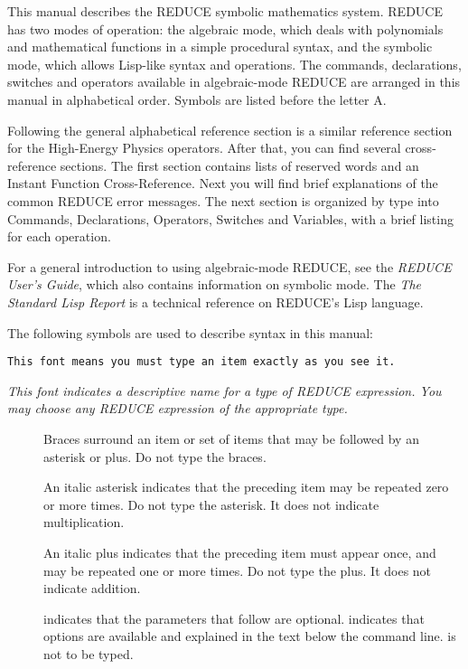 This manual describes the REDUCE symbolic mathematics system.  REDUCE has
two modes of operation: the algebraic mode, which deals with polynomials
and mathematical functions in a simple procedural syntax, and the symbolic
mode, which allows Lisp-like syntax and operations.  The commands,
declarations, switches and operators available in algebraic-mode REDUCE
are arranged in this manual in alphabetical order.  Symbols are listed
before the letter A.

Following the general alphabetical reference section is a similar
reference section for the High-Energy Physics operators.  After that, you
can find several cross-reference sections.  The first section contains
lists of reserved words and an Instant Function Cross-Reference.  Next you
will find brief explanations of the common REDUCE error messages.  The
next section is organized by type into Commands, Declarations, Operators,
Switches and Variables, with a brief listing for each operation.

For a general introduction to using algebraic-mode REDUCE, see the {\em
REDUCE User's Guide}, which also contains information on symbolic mode.
The {\em The Standard Lisp Report} is a technical reference on REDUCE's
Lisp language.

The following symbols are used to describe syntax in this manual:

\begin{verbatim}
This font means you must type an item exactly as you see it.
\end{verbatim}

{\em This font indicates a descriptive name for a type of REDUCE expression.
You may choose any REDUCE expression of the appropriate type.}

\begin{description}
\item[\meta{\{\}}]
Braces surround an item or set of items that may be followed by an
asterisk or plus.  Do not type the braces.

\item[\meta{*}]
An italic asterisk indicates that the preceding item may be repeated zero or 
more times. Do not type the asterisk.  It does not indicate multiplication.

\item[\meta{+}]
An italic plus indicates that the preceding item must appear once, and may be 
repeated one or more times.  Do not type the plus.  It does not indicate
addition.

\item[]
 indicates that the parameters that follow are optional.
 indicates that options are available and explained in the
text below the command line.   is not to be typed.
\end{description}

